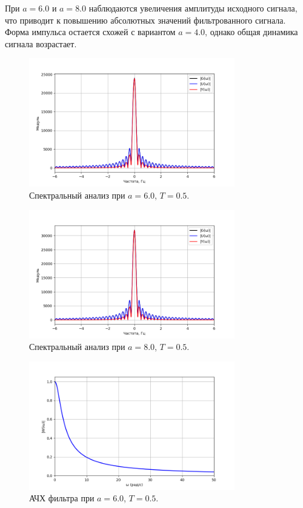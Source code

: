 \documentclass[a4paper]{article}
\begin{document}
\noindent При \(a=6.0\) и \(a=8.0\) наблюдаются увеличения амплитуды исходного сигнала, что приводит к повышению абсолютных значений фильтрованного сигнала. Форма импульса остается схожей с вариантом \(a=4.0\), однако общая динамика сигнала возрастает.

\begin{figure}[H]
  \centering
  \includegraphics[width=0.8\textwidth]{src/task_1_1/spec_6.0_0.5.png}
  \caption{Спектральный анализ при $a = 6.0$, $T = 0.5$.}
\end{figure}

\begin{figure}[H]
  \centering
  \includegraphics[width=0.8\textwidth]{src/task_1_1/spec_8.0_0.5.png}
  \caption{Спектральный анализ при \(a=8.0\), \(T=0.5\).}
\end{figure}

\begin{figure}[H]
  \centering
  \includegraphics[width=0.8\textwidth]{src/task_1_1/ach_6.0_0.5.png}
  \caption{АЧХ фильтра при $a = 6.0$, $T = 0.5$.}
\end{figure}
\end{document}
